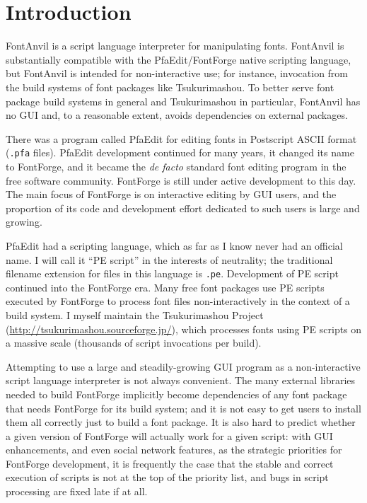 \documentclass[11pt]{report}
\begin{document}
\tableofcontents

\clearpage


\chapter{Introduction}

FontAnvil is a script language interpreter for manipulating fonts. 
FontAnvil is substantially compatible with the PfaEdit/FontForge native
scripting language, but FontAnvil is intended for non-interactive use; for
instance, invocation from the build systems of font packages like
Tsukurimashou.  To better serve font package build systems in general and
Tsukurimashou in particular, FontAnvil has no GUI and, to a reasonable
extent, avoids dependencies on external packages.

There was a program called PfaEdit for editing fonts in Postscript ASCII
format (\texttt{.pfa} files).  PfaEdit development continued for many years,
it changed its name to FontForge, and it became the \emph{de facto} standard
font editing program in the free software community.  FontForge is still
under active development to this day.  The main focus of FontForge is on
interactive editing by GUI users, and the proportion of its code and
development effort dedicated to such users is large and growing.

PfaEdit had a scripting language, which as far as I know never had an
official name.  I will call it ``PE script'' in the interests of neutrality;
the traditional filename extension for files in this language is
\texttt{.pe}.  Development of PE script continued into the FontForge era. 
Many free font packages use PE scripts executed by FontForge to process font
files non-interactively in the context of a build system.  I myself maintain
the Tsukurimashou Project (\url{http://tsukurimashou.sourceforge.jp/}),
which processes fonts using PE scripts on a massive scale (thousands of
script invocations per build).

Attempting to use a large and steadily-growing GUI program as a
non-interactive script language interpreter is not always convenient.  The
many external libraries needed to build FontForge implicitly become
dependencies of any font package that needs FontForge for its build system;
and it is not easy to get users to install them all correctly just to build
a font package.  It is also hard to predict whether a given version of
FontForge will actually work for a given script: with GUI enhancements, and
even social network features, as the strategic priorities for FontForge
development, it is frequently the case that the stable and correct execution
of scripts is not at the top of the priority list, and bugs in script
processing are fixed late if at all.
\end{document}
